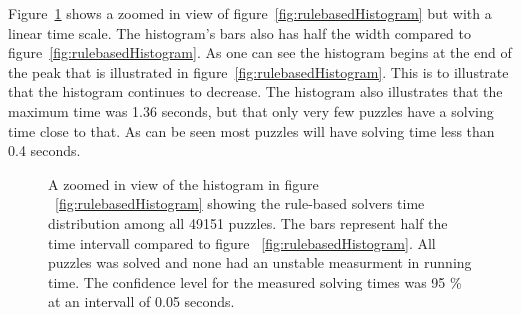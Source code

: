 \documentclass[a4paper,11pt]{kth-mag}
\begin{document}
Figure~\ref{fig:rulebasedHistogram2} shows a zoomed in view of figure~\ref{fig:rulebasedHistogram} but with a linear time scale.
The histogram's bars also has half the width compared to figure~\ref{fig:rulebasedHistogram}.
As one can see the histogram begins at the end of the peak that is illustrated in figure~\ref{fig:rulebasedHistogram}.
This is to illustrate that the histogram continues to decrease.
The histogram also illustrates that the maximum time was 1.36 seconds, but that only very few puzzles have a solving time close to that.
As can be seen most puzzles will have solving time less than 0.4 seconds.
\\
\begin{figure}[here] 
\noindent{}
\vspace{-40pt}
\caption{A zoomed in view of the histogram in figure ~\ref{fig:rulebasedHistogram} showing the rule-based solvers time distribution among all 49151 puzzles. The bars represent half the time intervall compared to figure ~\ref{fig:rulebasedHistogram}. All puzzles was solved and none had an unstable measurment in running time. The confidence level for the measured solving times was 95 \% at an intervall of 0.05 seconds.}
\label{fig:rulebasedHistogram2}
\end{figure}
\end{document}
